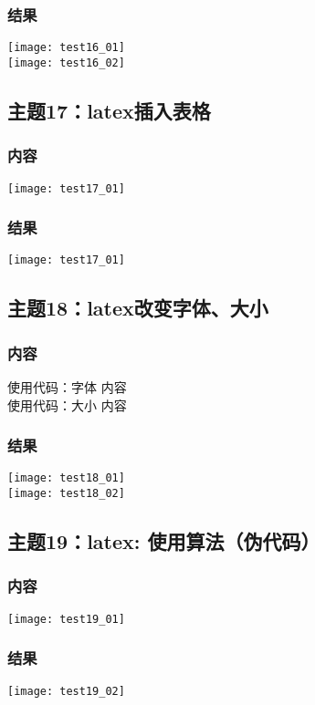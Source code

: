 \documentclass{article}
\begin{document}
\subsubsection{结果}  
\texttt{[image: test16\_01]}\\
\texttt{[image: test16\_02]}\\
\vspace{1cm}
\subsection{主题17：latex插入表格}  
\subsubsection{内容}
\texttt{[image: test17\_01]}\\
\subsubsection{结果}  
\texttt{[image: test17\_01]}\\
\vspace{1cm}
\subsection{主题18：latex改变字体、大小}  
\subsubsection{内容}
使用代码：{字体 内容}\\
使用代码：{大小 内容}
\subsubsection{结果}  
\texttt{[image: test18\_01]}\\
\texttt{[image: test18\_02]}\\
\vspace{1cm}
\subsection{主题19：latex: 使用算法（伪代码）}  
\subsubsection{内容}
\texttt{[image: test19\_01]}\\
\subsubsection{结果}  
\texttt{[image: test19\_02]}\\
\vspace{1cm}
\end{document}

